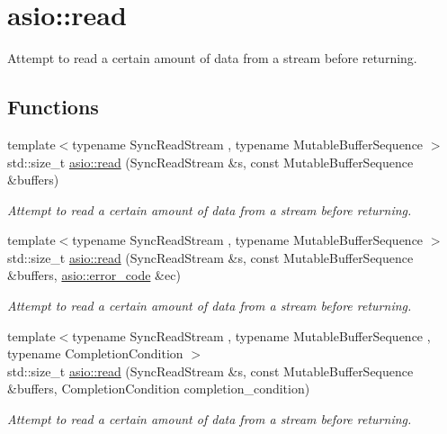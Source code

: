 \hypertarget{group__read}{}\section{asio\+:\+:read}
\label{group__read}


Attempt to read a certain amount of data from a stream before returning.  


\subsection*{Functions}
\begin{DoxyCompactItemize}
\item 
{\footnotesize template$<$typename Sync\+Read\+Stream , typename Mutable\+Buffer\+Sequence $>$ }\\std\+::size\+\_\+t \hyperlink{group__read_ga9c82bf41e199a1c6a5e1c19dbb79d4f8}{asio\+::read} (Sync\+Read\+Stream \&s, const Mutable\+Buffer\+Sequence \&buffers)
\begin{DoxyCompactList}\small\item\em Attempt to read a certain amount of data from a stream before returning. \end{DoxyCompactList}\item 
{\footnotesize template$<$typename Sync\+Read\+Stream , typename Mutable\+Buffer\+Sequence $>$ }\\std\+::size\+\_\+t \hyperlink{group__read_ga96a4f3670e5250b6f8703337b583f1c9}{asio\+::read} (Sync\+Read\+Stream \&s, const Mutable\+Buffer\+Sequence \&buffers, \hyperlink{classasio_1_1error__code}{asio\+::error\+\_\+code} \&ec)
\begin{DoxyCompactList}\small\item\em Attempt to read a certain amount of data from a stream before returning. \end{DoxyCompactList}\item 
{\footnotesize template$<$typename Sync\+Read\+Stream , typename Mutable\+Buffer\+Sequence , typename Completion\+Condition $>$ }\\std\+::size\+\_\+t \hyperlink{group__read_ga3d689815cf77799d209397d92d0a2f79}{asio\+::read} (Sync\+Read\+Stream \&s, const Mutable\+Buffer\+Sequence \&buffers, Completion\+Condition completion\+\_\+condition)
\begin{DoxyCompactList}\small\item\em Attempt to read a certain amount of data from a stream before returning. \end{DoxyCompactList}\item 

\end{DoxyCompactItemize}
